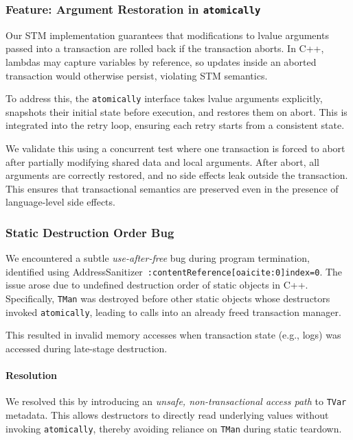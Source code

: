 \documentclass[11pt,a4paper]{article}
\begin{document}
\subsubsection{Feature: Argument Restoration in \texttt{atomically}}

Our STM implementation guarantees that modifications to lvalue arguments passed into a transaction are rolled back if the transaction aborts. In C++, lambdas may capture variables by reference, so updates inside an aborted transaction would otherwise persist, violating STM semantics.

To address this, the \texttt{atomically} interface takes lvalue arguments explicitly, snapshots their initial state before execution, and restores them on abort. This is integrated into the retry loop, ensuring each retry starts from a consistent state.

We validate this using a concurrent test where one transaction is forced to abort after partially modifying shared data and local arguments. After abort, all arguments are correctly restored, and no side effects leak outside the transaction. This ensures that transactional semantics are preserved even in the presence of language-level side effects.

\subsubsection{Static Destruction Order Bug}

We encountered a subtle \textit{use-after-free} bug during program termination, identified using AddressSanitizer~\mbox{\small\texttt{:contentReference[oaicite:0]{index=0}}}. The issue arose due to undefined destruction order of static objects in C++. Specifically, \texttt{TMan} was destroyed before other static objects whose destructors invoked \texttt{atomically}, leading to calls into an already freed transaction manager.

This resulted in invalid memory accesses when transaction state (e.g., logs) was accessed during late-stage destruction.

\paragraph{Resolution}
We resolved this by introducing an \textit{unsafe, non-transactional access path} to \texttt{TVar} metadata. This allows destructors to directly read underlying values without invoking \texttt{atomically}, thereby avoiding reliance on \texttt{TMan} during static teardown.
\end{document}
